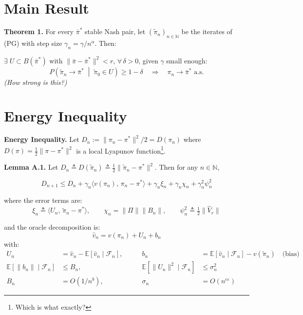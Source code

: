 \documentclass[a4paper,oneside,11pt]{report}
\begin{document}

\section{Main Result}

\textbf{Theorem 1.} For every $\bar{\pi}^*$ stable Nash pair, let $(\tilde{\pi}_n)_{n \in \mathbb{N}}$ be the iterates of (PG) with step size $\gamma_n = \gamma / n^\alpha$. Then:

$\exists\; U \subset B(\bar{\pi}^*)$ with $\|\bar{\pi} - \bar{\pi}^*\|^2 < r$, $\forall\, \delta > 0$, given $\gamma$ small enough:
\[
  P\!\left(\tilde{\pi}_n \to \bar{\pi}^* \;\middle|\; \tilde{\pi}_0 \in U\right) \geq 1 - \delta \quad \Longrightarrow \quad \pi_n \to \bar{\pi}^* \text{ a.s.}
\]
\textit{(How strong is this?)}


\section{Energy Inequality}

\textbf{Energy Inequality.} Let $D_n := \|\pi_n - \pi ^ *\| ^2 / 2 = D(\pi_n)$ where $D(\pi) = \frac{1}{2} \| \pi - \pi^*\|^2$ is a local Lyapunov function\footnote{Which is what exactly?}.

\textbf{Lemma A.1.} Let $D_n \triangleq D(\tilde{\pi}_n) \triangleq \frac{1}{2}\|\tilde{\pi}_n - \pi^*\|^2$. Then for any $n \in \mathbb{N}$,

\[
  D_{n+1} \leq D_n + \gamma_n \langle v(\pi_n),\, \pi_n - \pi^* \rangle + \gamma_n \xi_n + \gamma_n \chi_n + \gamma_n^2 \psi_n^2
\]

where the error terms are:
\[
  \xi_n \triangleq \langle U_n,\, \tilde{\pi}_n - \pi^* \rangle, \qquad
  \chi_n = \|\Pi\| \|B_n\|, \qquad
  \psi_n^2 \triangleq \tfrac{1}{2}\|\hat{V}_r\|
\]

and the oracle decomposition is:
\[
  \hat{v}_n = v(\pi_n) + U_n + b_n
\]
with:
\begin{align*}
  U_n &= \hat{v}_n - \mathbb{E}[\hat{v}_n \mid \mathcal{F}_n], &\qquad b_n &= \mathbb{E}[\hat{v}_n \mid \mathcal{F}_n] - v(\tilde{\pi}_n) \quad \text{(bias)} \\
  \mathbb{E}[\|b_n\| \mid \mathcal{F}_n] &\leq B_n, &\qquad \mathbb{E}[\|U_n\|^2 \mid \mathcal{F}_n] &\leq \sigma_n^2 \\
  B_n &= O(1/n^b), &\qquad \sigma_n &= O(n^{c\varepsilon})
\end{align*}
\end{document}
